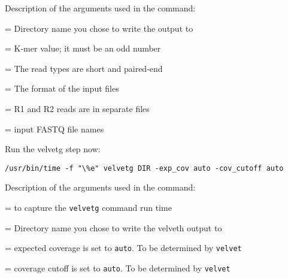 Description of the arguments used in the command:
\begin{description}[style=multiline,labelindent=0cm,align=right,leftmargin=\descriptionlabelspace,rightmargin=1.5cm,font=\ttfamily]
  \item[DIR] = Directory name you chose to write the output to
  \item[K] = K-mer value; it must be an odd number
  \item[-shortPaired] = The read types are short and paired-end
  \item[-fastq.gz] = The format of the input files
  \item[-separate] = R1 and R2 reads are in separate files
  \item[input file names] = input FASTQ file names
\end{description}

\begin{steps}
Run the velvetg step now:
\begin{lstlisting}
/usr/bin/time -f "\%e" velvetg DIR -exp_cov auto -cov_cutoff auto
\end{lstlisting}
\end{steps}

Description of the arguments used in the command:
\begin{description}[style=multiline,labelindent=0cm,align=right,leftmargin=\descriptionlabelspace,rightmargin=1.5cm,font=\ttfamily]
  \item[time] = to capture the \texttt{velvetg} command run time
  \item[DIR] = Directory name you chose to write the velveth output to
  \item[-exp\_cov] = expected coverage is set to \texttt{auto}. To be determined by \texttt{velvet}
  \item[-cov\_cutoff] = coverage cutoff is set to \texttt{auto}. To be determined by \texttt{velvet}
\end{description}

